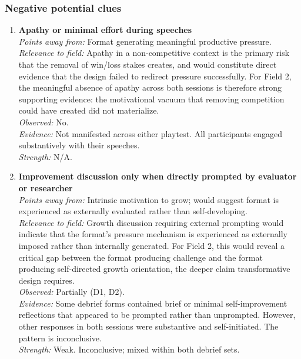 \documentclass[12pt]{article}
\begin{document}
\subsubsection*{Negative potential clues}

\begin{enumerate}

\item \textbf{Apathy or minimal effort during speeches}\\
\textit{Points away from:} Format generating meaningful productive pressure.\\
\textit{Relevance to field:} Apathy in a non-competitive context is the primary risk that the removal of win/loss stakes creates, and would constitute direct evidence that the design failed to redirect pressure successfully. For Field 2, the meaningful absence of apathy across both sessions is therefore strong supporting evidence: the motivational vacuum that removing competition could have created did not materialize.\\
\textit{Observed:} No.\\
\textit{Evidence:} Not manifested across either playtest. All participants engaged substantively with their speeches.\\
\textit{Strength:} N/A.

\item \textbf{Improvement discussion only when directly prompted by evaluator or researcher}\\
\textit{Points away from:} Intrinsic motivation to grow; would suggest format is experienced as externally evaluated rather than self-developing.\\
\textit{Relevance to field:} Growth discussion requiring external prompting would indicate that the format's pressure mechanism is experienced as externally imposed rather than internally generated. For Field 2, this would reveal a critical gap between the format producing challenge and the format producing self-directed growth orientation, the deeper claim transformative design requires.\\
\textit{Observed:} Partially (D1, D2).\\
\textit{Evidence:} Some debrief forms contained brief or minimal self-improvement reflections that appeared to be prompted rather than unprompted. However, other responses in both sessions were substantive and self-initiated. The pattern is inconclusive.\\
\textit{Strength:} Weak. Inconclusive; mixed within both debrief sets.


\end{enumerate}
\end{document}
